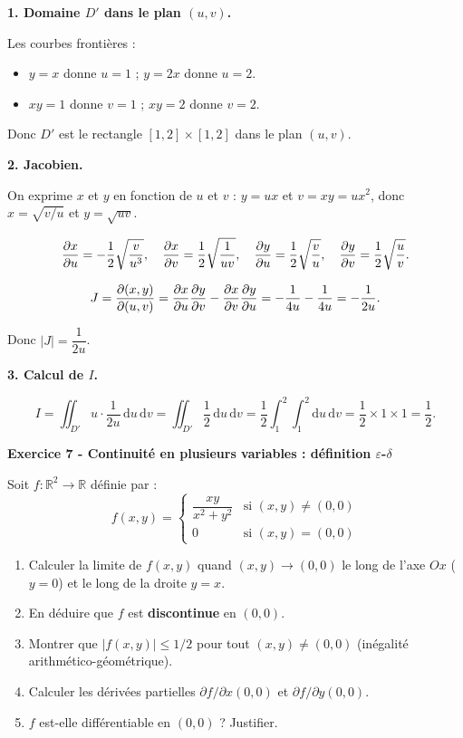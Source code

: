 \documentclass[12pt,a4paper]{article}
\begin{document}
\begin{boitecorrige}
\textbf{1. Domaine $D'$ dans le plan $(u,v)$.}

Les courbes frontières :
\begin{itemize}
  \item $y = x$ donne $u = 1$ ; $y = 2x$ donne $u = 2$.
  \item $xy = 1$ donne $v = 1$ ; $xy = 2$ donne $v = 2$.
\end{itemize}
Donc $D'$ est le rectangle $[1,2] \times [1,2]$ dans le plan $(u,v)$.

\textbf{2. Jacobien.}

On exprime $x$ et $y$ en fonction de $u$ et $v$ : $y = ux$ et $v = xy = ux^2$, donc $x = \sqrt{v/u}$ et $y = \sqrt{uv}$.

\[
\dfrac{\partial x}{\partial u} = -\frac{1}{2}\sqrt{\frac{v}{u^3}}, \quad
\dfrac{\partial x}{\partial v} = \frac{1}{2}\sqrt{\frac{1}{uv}}, \quad
\dfrac{\partial y}{\partial u} = \frac{1}{2}\sqrt{\frac{v}{u}}, \quad
\dfrac{\partial y}{\partial v} = \frac{1}{2}\sqrt{\frac{u}{v}}.
\]

\[
J = \dfrac{\partial (x,y)}{\partial (u,v)} = \dfrac{\partial x}{\partial u}\dfrac{\partial y}{\partial v} - \dfrac{\partial x}{\partial v}\dfrac{\partial y}{\partial u}
= -\frac{1}{4u} - \frac{1}{4u} = -\frac{1}{2u}.
\]

Donc $|J| = \dfrac{1}{2u}$.

\textbf{3. Calcul de $I$.}

\[
I = \iint_{D'} u \cdot \frac{1}{2u}\,\mathrm{d}u\,\mathrm{d}v
= \iint_{D'} \frac{1}{2}\,\mathrm{d}u\,\mathrm{d}v
= \frac{1}{2} \int_1^2\!\int_1^2 \mathrm{d}u\,\mathrm{d}v
= \frac{1}{2} \times 1 \times 1 = \frac{1}{2}.
\]
\end{boitecorrige}

\begin{boiteexercice}
\textbf{Exercice 7 - Continuité en plusieurs variables : définition $\varepsilon$-$\delta$}\niveau{\moyen}

Soit $f : \mathbb{R}^2 \to \mathbb{R}$ définie par :
\[
f(x,y) = \begin{cases}\dfrac{xy}{x^2+y^2} & \text{si }(x,y)\neq(0,0)\\0 & \text{si }(x,y)=(0,0)\end{cases}
\]
\begin{enumerate}
  \item Calculer la limite de $f(x,y)$ quand $(x,y)\to(0,0)$ le long de l'axe $Ox$ ($y=0$) et le long de la droite $y=x$.
  \item En déduire que $f$ est \textbf{discontinue} en $(0,0)$.
  \item Montrer que $|f(x,y)|\leq 1/2$ pour tout $(x,y)\neq(0,0)$ (inégalité arithmético-géométrique).
  \item Calculer les dérivées partielles $\partial f/\partial x(0,0)$ et $\partial f/\partial y(0,0)$.
  \item $f$ est-elle différentiable en $(0,0)$ ? Justifier.
\end{enumerate}
\end{boiteexercice}
\end{document}

